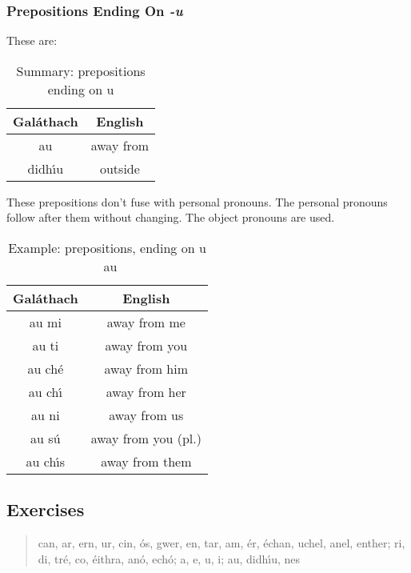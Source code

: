 \subsubsection{Prepositions Ending On \textit{-u}}
These are:
\begin{table}[H]
\centering
\begin{tabu}{c|c}
  \textbf{Gal\'{a}thach} & \textbf{English}\\
  \toprule
  au & away from\\
  didh\'{\i}u & outside
\end{tabu}
\caption{Summary: prepositions ending on u}
\label{summary_prepositions_ending_on_u}
\end{table}

These prepositions don't fuse with personal pronouns. The personal pronouns follow after them without changing. The object pronouns are used.
\begin{table}[H]
\centering
\begin{tabu}{c|c}
  \textbf{Gal\'{a}thach} & \textbf{English}\\
  \toprule
  au mi & away from me\\
  au ti & away from you\\
  au ch\'{e} & away from him\\
  au ch\'{\i} & away from her\\
  au ni & away from us\\
  au s\'{u} & away from you (pl.)\\
  au ch\'{\i}s & away from them
\end{tabu}
\caption{Example: prepositions, ending on u \textendash\ au}
\label{example_prepositions_ending_on_u_au}
\end{table}

\newpage
\subsection{Exercises}

\begin{quote}
can, ar, ern, ur, cin, \'{o}s, gwer, en, tar, am, \'{e}r, \'{e}chan, uchel, anel, enther; ri, di, tr\'{e}, co, \'{e}ithra, an\'{o}, ech\'{o}; a, e, u, i; au, didh\'{\i}u, nes
\end{quote}


